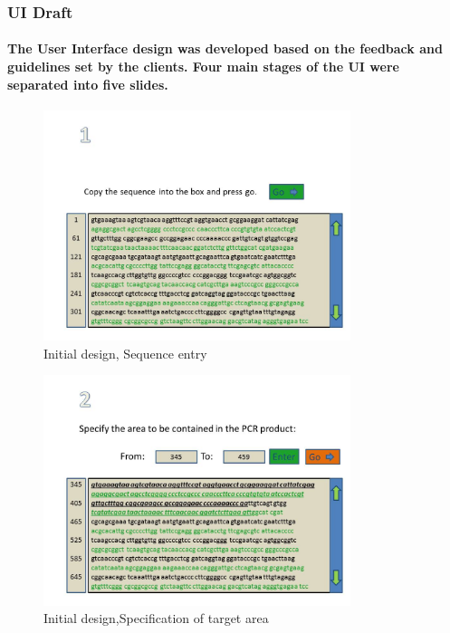 

\begin{frame}
\frametitle{UI Draft}
\framesubtitle{The User Interface design was developed based on the feedback and
guidelines set by the clients. Four main stages of the UI were separated into five slides.}



\begin{figure}[h]
  \begin{center}
	\includegraphics[width=0.8\textwidth]{./img/UiDes/Slide1.JPG}
    \caption{
      \label{fig:UiDes:slide1}
      Initial design, Sequence entry
    }
  \end{center}
\end{figure}
\end{frame}

\begin{frame}

\begin{figure}[h]
  \begin{center}
	\includegraphics[width=0.8\textwidth]{./img/UiDes/Slide2.JPG}
    \caption{
      \label{fig:UiDes:slide2}
      Initial design,Specification of target area
    }
  \end{center}
\end{figure}

\end{frame}

